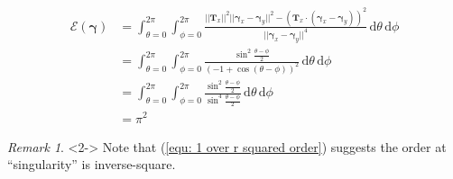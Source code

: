 \documentclass{beamer}
\theoremstyle{remark}
\newtheorem{remark}{Remark}
\newcommand{\gammabf}{\boldsymbol{\gamma}}
\newcommand{\intd}{\, \text{d}}
\newcommand{\norm}[1]{\lvert \lvert #1 \rvert \rvert}
\begin{document}

\begin{frame}
    \begin{example}
        \begin{align}
            \mathcal{E} \left( \gammabf \right) &= \int_{\theta=0}^{2 \pi} \int_{\phi=0}^{2 \pi}
            \frac{\norm{\mathbf{T}_x}^2 \norm{\gammabf_x - \gammabf_y}^2 - \left( \mathbf{T}_x \cdot \left( \gammabf_x -\gammabf_y \right) \right)^2}{\norm{\gammabf_x - \gammabf_y}^4} \intd \theta \intd \phi \\
            &= \int_{\theta=0}^{2 \pi} \int_{\phi=0}^{2 \pi}
            \frac{\sin^2 \frac{\theta - \phi}{2}}{\left( -1 + \cos \left( \theta - \phi \right) \right)^2} \intd \theta \intd \phi \\
            &= \int_{\theta=0}^{2 \pi} \int_{\phi=0}^{2 \pi}
            \frac{\sin^2 \frac{\theta - \phi}{2}}{\sin^4 \frac{\theta - \phi}{2}} \intd \theta \intd \phi
            \label{equ: 1 over r squared order}
            \\
            &= \pi^2
        \end{align}
    \end{example}
    \begin{remark}<2->
        Note that (\ref{equ: 1 over r squared order}) suggests the order at ``singularity'' is inverse-square.
    \end{remark}
\end{frame}
\end{document}
